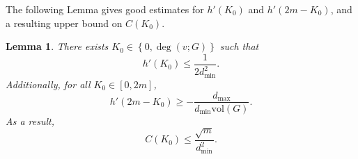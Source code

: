 \documentclass[11pt,twoside]{article}
\newtheorem{lemma}{Lemma}
\theoremstyle{definition}
\newcommand{\set}[1]{\left\{#1\right\}}
\newcommand{\vol}{\mathrm{vol}}
\newcommand{\1}{\mathbbm{1}}
\begin{document}
The following Lemma gives good estimates for $h'(K_0)$ and $h'(2m - K_0)$, and a resulting upper bound on $C(K_0)$.
\begin{lemma}
	\label{lem:linearization_bound}
	There exists $K_0 \in \set{0,\deg(v;G)}$ such that
	\begin{equation}
	\label{eqn:left_derivative}
	h'(K_0) \leq  \frac{1}{2d_{\min}^2}.
	\end{equation}
	Additionally, for all $K_0 \in [0,2m]$,
	\begin{equation}
	\label{eqn:right_derivative}
	h'(2m - K_0) \geq -\frac{d_{\max}}{d_{\min}\vol(G)}.
	\end{equation}
	As a result,
	\begin{equation*}
	C(K_0) \leq \frac{\sqrt{m}}{d_{\min}^2}.
	\end{equation*}
\end{lemma}
\end{document}
